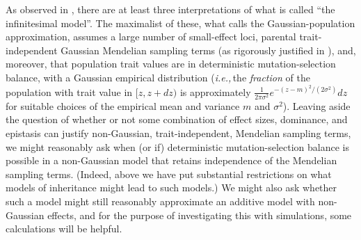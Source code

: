 \documentclass{article}
\newcommand{\ie}{\textit{i.e.,}\,}
\newcommand{\1}{\mathbbm{1}}
\theoremstyle{remark}
\theoremstyle{definition}
\begin{document}
As observed in \cite{turelli2017commentary}, there are at least three interpretations of what is called ``the infinitesimal model''.  The maximalist of these, what \cite{turelli2017commentary} calls the Gaussian-population approximation, assumes a large number of small-effect loci,  parental trait-independent Gaussian Mendelian sampling terms  (as rigorously justified in \cite{barton2017infinitesimal,barton2022infinitesimal}), and, moreover, that  population trait values are in deterministic mutation-selection balance, with a Gaussian empirical distribution
(\ie the \emph{fraction} of the population with trait value in $[z,z+dz)$
is approximately $\frac{1}{2\pi\sigma^{2}} e^{-(z-m)^{2}/(2\sigma^{2})} dz$
for suitable choices of the empirical mean and variance $m$ and $\sigma^{2}$).
Leaving aside
the question of whether or not some combination of effect sizes, dominance, and epistasis can justify non-Gaussian, trait-independent,  Mendelian sampling terms, we might reasonably ask when (or if)
deterministic mutation-selection balance is possible in a non-Gaussian model
that retains independence of the Mendelian sampling terms.
(Indeed, above we have put substantial restrictions on what models of inheritance
might lead to such models.)
We might also ask whether such a model
might still reasonably approximate an additive model with non-Gaussian effects,
and for the purpose of investigating this with simulations,
some calculations will be helpful.
\end{document}
